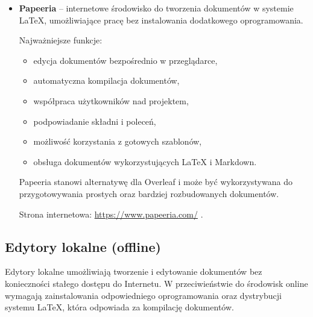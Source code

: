 \begin{itemize}
Prism oferuje bezpłatny dostęp do podstawowych funkcji za pośrednictwem konta ChatGPT. Nie wymaga instalowania lokalnej dystrybucji \LaTeX{}. 

Strona internetowa: \url{https://prism.openai.com/} \cite{PrismExample}.

    \item \textbf{Papeeria} -- internetowe środowisko do tworzenia dokumentów w systemie \LaTeX{}, umożliwiające pracę bez instalowania dodatkowego oprogramowania.

    Najważniejsze funkcje:
    \begin{itemize}
        \item edycja dokumentów bezpośrednio w przeglądarce,
        \item automatyczna kompilacja dokumentów,
        \item współpraca użytkowników nad projektem,
        \item podpowiadanie składni i poleceń,
        \item możliwość korzystania z gotowych szablonów,
        \item obsługa dokumentów wykorzystujących LaTeX i Markdown.
    \end{itemize}

    Papeeria stanowi alternatywę dla Overleaf i może być wykorzystywana do przygotowywania prostych oraz bardziej rozbudowanych dokumentów.

    Strona internetowa: \url{https://www.papeeria.com/} \cite{PapeeriaExample}.

\end{itemize}


\subsection{Edytory lokalne (offline)}

Edytory lokalne umożliwiają tworzenie i edytowanie dokumentów bez konieczności stałego dostępu do Internetu. W przeciwieństwie do środowisk online wymagają zainstalowania odpowiedniego oprogramowania oraz dystrybucji systemu \LaTeX{}, która odpowiada za kompilację dokumentów.

